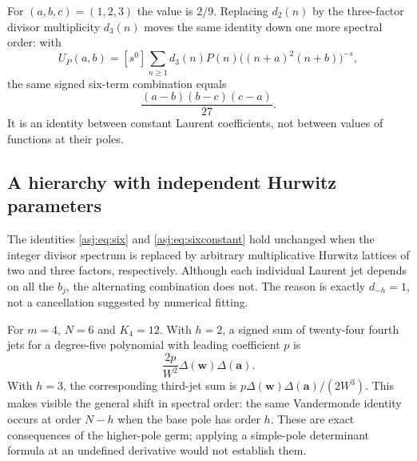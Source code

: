 For $(a,b,c)=(1,2,3)$ the value is $2/9$. Replacing $d_2(n)$ by the
three-factor divisor multiplicity $d_3(n)$ moves the same identity down
one more spectral order: with
\[
 U_P(a,b)=[s^0]\sum_{n\ge1}d_3(n)P(n)
                  \bigl((n+a)^2(n+b)\bigr)^{-s},
\]
the same signed six-term combination equals
\begin{equation}\label{asj:eq:sixconstant}
 \frac{(a-b)(b-c)(c-a)}{27}.
\end{equation}
It is an identity between constant Laurent coefficients, not between
values of functions at their poles.

\subsection{A hierarchy with independent Hurwitz parameters}
The identities \eqref{asj:eq:six} and \eqref{asj:eq:sixconstant} hold unchanged
when the integer divisor spectrum is replaced by arbitrary multiplicative
Hurwitz lattices of two and three factors, respectively. Although each
individual Laurent jet depends on all the $b_j$, the alternating
combination does not. The reason is exactly $d_{-h}=1$, not a cancellation
suggested by numerical fitting.

For $m=4$, $N=6$ and $K_4=12$. With $h=2$, a signed sum of twenty-four
fourth jets for a degree-five polynomial with leading coefficient $p$
is
\[
 \frac{2p}{W^2}\Delta(\boldsymbol w)\Delta(\boldsymbol a).
\]
With $h=3$, the corresponding third-jet sum is
$p\Delta(\boldsymbol w)\Delta(\boldsymbol a)/(2W^3)$.
This makes visible the general shift in spectral order: the same
Vandermonde identity occurs at order $N-h$ when the base pole has order
$h$. These are exact consequences of the higher-pole germ; applying a
simple-pole determinant formula at an undefined derivative would not
establish them.
